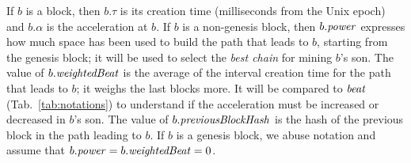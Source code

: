 %
If $b$ is a block, then $b.\tau$ is its creation time (milliseconds from the Unix epoch)
and $b.\alpha$ is the acceleration at $b$. If $b$ is a non-genesis block, then
$b.{\mathit{power}}$ expresses how much space has been used to build the path that leads to $b$,
starting from the genesis block; it will be used to select the \emph{best chain} for mining
$b$'s son. The value of $b.\mathit{weightedBeat}$ is the average of the interval creation time
for the path that leads to $b$; it weighs the last blocks more. It will be
compared to ${\mathit{beat}}$ (Tab.~\ref{tab:notations}) to understand if the acceleration
must be increased or decreased in $b$'s son.
The value of $b.{\mathit{previousBlockHash}}$ is the hash of the previous block in the path leading to $b$.
If $b$ is a genesis block, we abuse notation and assume that $b.{\mathit{power}}=b.\mathit{weightedBeat}=0$.

